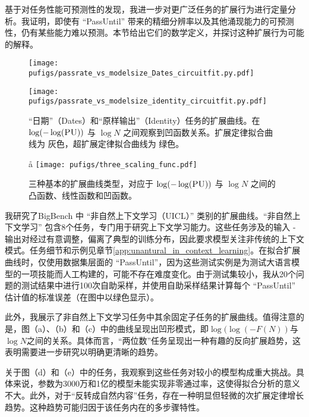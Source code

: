 {基于对任务性能可预测性的发现，我进一步对更广泛任务的扩展行为进行定量分析。我证明，即使有 “PassUntil” 带来的精细分辨率以及其他涌现能力的可预测性，仍有某些能力难以预测。本节给出它们的数学定义，并探讨这种扩展行为可能的解释。}
\begin{figure}
    \centering
        \centering
        \texttt{[image: pufigs/passrate\_vs\_modelsize\_Dates\_circuitfit.py.pdf]}
        \centering
\end{figure}
\begin{figure}
        \texttt{[image: pufigs/passrate\_vs\_modelsize\_identity\_circuitfit.py.pdf]}
        \caption{{“日期”（Dates）和“原样输出”（Identity）任务的扩展曲线。在 $\operatorname{log}(-\operatorname{log}(\textsc{PU}))$ 与 $\operatorname{log}N$ 之间观察到凹函数关系。扩展定律拟合曲线为 {\color[rgb]{0.55, 0.6, 0.6}灰色}，超扩展定律拟合曲线为 {\color[rgb]{0.3, 0.6, 0.45}绿色}。}}
        \label{fig:unnatural}
\end{figure}
\begin{figure}å
    \centering
    \texttt{[image: pufigs/three\_scaling\_func.pdf]}
    \caption{三种基本的扩展曲线类型，对应于 $\log(-\log(\textsc{PU}))$ 与 $\log N$ 之间的凸函数、线性函数和凹函数。}
    \label{fig:threekindsofgrowth}
\end{figure}

我研究了BigBench\citep{srivastava2022beyond} 中 “非自然上下文学习（UICL）” 类别的扩展曲线。“非自然上下文学习” 包含8个任务，专门用于研究上下文学习能力。这些任务涉及的输入 - 输出对经过有意调整，偏离了典型的训练分布，因此要求模型关注非传统的上下文模式。任务细节和示例见章节\ref{app:unantural_in_context_learning}。在拟合扩展曲线时，仅使用数据集层面的 “PassUntil”，因为这些测试实例是为测试大语言模型的一项技能而人工构建的，可能不存在难度变化。由于测试集较小，我从20个问题的测试结果中进行100次自助采样，并使用自助采样结果计算每个 “PassUntil” 估计值的标准误差（在图中以绿色显示）。 

此外，我展示了非自然上下文学习任务中其余固定子任务的扩展曲线。值得注意的是，图（a）、（b）和（c）中的曲线呈现出凹形模式，即\(\log(\log(-F(N))\)与\(\log N\)之间的关系。具体而言，“两位数”任务呈现出一种有趣的反向扩展趋势，这表明需要进一步研究以明确更清晰的趋势。

{
关于图（d）和（e）中的任务，我观察到这些任务对较小的模型构成重大挑战。具体来说，参数为3000万和1亿的模型未能实现非零通过率，这使得拟合分析的意义不大。此外，对于“反转成自然内容”任务，存在一种明显但轻微的次扩展定律增长趋势。这种趋势可能归因于该任务内在的多步骤特性。
}

